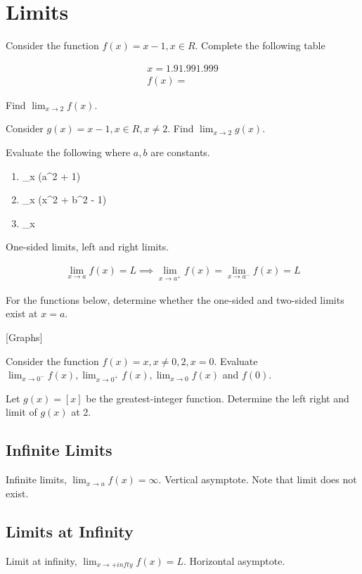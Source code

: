 \documentclass[letterpaper]{article}
\begin{document}
\section{Limits}
Consider the function $f(x) = x - 1, x \in R$. Complete the following table

\begin{align*}
x = 1.9 1.99 1.999 \\
f(x) =
\end{align*}

Find $\lim_{x \to 2} f(x)$.

Consider $g(x) = x - 1, x \in R, x \ne 2$. Find $\lim_{x \to 2} g(x)$.

Evaluate the following where $a, b$ are constants.

\begin{enumerate}
\item \lim_{x } (a^2 + 1)
\item \lim_{x } (x^2 + b^2 - 1)
\item \lim_{x } 
\end{enumerate}

One-sided limits, left and right limits.

\begin{align*}
\lim_{x \to a} f(x) = L \implies \lim_{x \to a^+} f(x) = \lim_{x \to a^-} f(x) = L
\end{align*}

For the functions below, determine whether the one-sided and two-sided limits exist at $x=a$.

[Graphs]

Consider the function $f(x) = x, x \ne 0, 2, x = 0$. Evaluate $\lim_{x \to 0^-} f(x), \lim_{x \to 0^+} f(x), \lim_{x \to 0} f(x)$ and $f(0)$.

Let $g(x) = [x]$ be the greatest-integer function. Determine the left right and limit of $g(x)$ at 2.

\subsection{Infinite Limits}
Infinite limits, $\lim_{x \to a} f(x) = \infty$. Vertical asymptote. Note that limit does not exist.

\subsection{Limits at Infinity}
Limit at infinity, $\lim_{x \to +infty} f(x) = L$. Horizontal asymptote.
\end{document}
